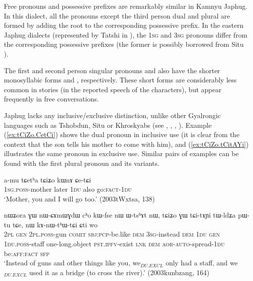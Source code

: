Free pronouns and possessive prefixes are remarkably similar in Kamnyu Japhug. In this dialect, all the pronouns except the third person dual and plural are formed by adding the root  to the corresponding possessive prefix. In the eastern Japhug dialects (represented by Tatshi in ), the \textsc{1sg}   and \textsc{3sg}   pronouns differ from the corresponding possessive prefixes (the former is possibly borrowed from Situ ). 

The first and second person singular pronouns   and  also have the shorter monosyllabic forms  and , respectively. These short forms are considerably less common in stories (in the reported speech of the characters), but appear frequently in free conversations.

Japhug lacks any inclusive/exclusive distinction, unlike other Gyalrongic languages such as Tshobdun, Situ or Khroskyabs (see \citealt{jackson98morphology}, \citealt[177]{linxr93jiarong}, \citealt[92]{prins16kyomkyo}, \citealt[170]{lai17khroskyabs}). Example  (\ref{ex:tCiZo.CetCi}) shows the dual pronoun  in inclusive use (it is clear from the context that the son tells his mother to come with him), and (\ref{ex:tCiZo.tCitAYi}) illustrates the same pronoun in exclusive use. Similar pairs of examples can be found with the first plural pronoun  and its variants.

\begin{exe}
\ex \label{ex:tCiZo.CetCi}
\gll a-mu tɕetʰa tɕiʑo kɯnɤ ɕe-tɕi \\
\textsc{1sg}.\textsc{poss}-mother later \textsc{1du} also go:\textsc{fact}-\textsc{1du} \\
\glt `Mother, you and I will go too.' (2003tWxtsa, 138)
\end{exe}

\begin{exe}
\ex \label{ex:tCiZo.tCitAYi}
\gll nɯʑora ɣɯ nɯ-ɕɤmɯɣdɯ cʰo kɯ-fse nɯ ɯ-tsʰɤt nɯ, tɕiʑo ɣɯ tɕi-tɤɲi tɯ-ldʑa pɯ-tu tɕe, nɯ kɤ-nɯ-tʰɯ-tɕi ɕti wo \\
\textsc{2pl} \textsc{gen} \textsc{2pl}.\textsc{poss}-gun \textsc{comit} \textsc{sbj}:\textsc{pcp}-be.like \textsc{dem} \textsc{3sg}-instead \textsc{dem} \textsc{1du} \textsc{gen} \textsc{1du}.\textsc{poss}-staff one-long.object \textsc{pst}.\textsc{ipfv}-exist \textsc{lnk} \textsc{dem} \textsc{aor}-\textsc{auto}-spread-\textsc{1du} be:\textsc{aff}:\textsc{fact} \textsc{sfp} \\
\glt `Instead of guns and other things like you, we$_{DU.EXCL}$ only had a staff, and we$_{DU.EXCL}$ used it as a bridge (to cross the river).' (2003kunbzang, 164)
\end{exe}

